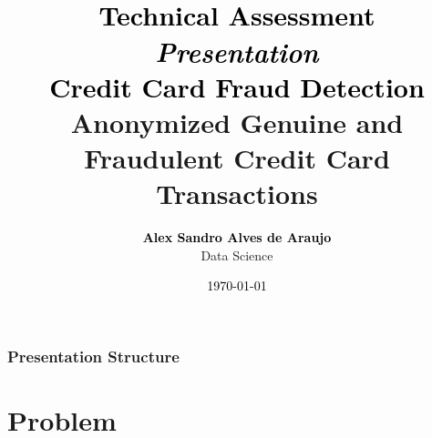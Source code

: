 \documentclass[11pt]{beamer}
\begin{document}
\title[
  \textbf{\textcolor{blue}{
    Presentation
  }} 
]{\\[0.01cm]
  \large{\textbf{\textcolor{black}{
    Technical Assessment
  }}} \\
  
  \small{\textcolor{black}{
    \emph{Presentation}
  }} \\[0.50cm]

  \large{\textbf{\textcolor{black}{
	  Credit Card Fraud Detection
  }}} \\
    \small{Anonymized Genuine and Fraudulent Credit Card Transactions}
} 

\author{
  \textcolor{black}{\textbf{
      Alex Sandro Alves de Araujo 
  }} \\
    \small{Data Science}
} 


\date{
  \textcolor{black}{
    \today
  }
}

%
%

{
  \begin{frame}
    \titlepage 
  \end{frame}
}

\begin{frame}
  \frametitle{\normalsize{\textbf{
    Presentation Structure
  }}}
  
  \tableofcontents
  
\end{frame}

\section{Problem}
\end{document}
